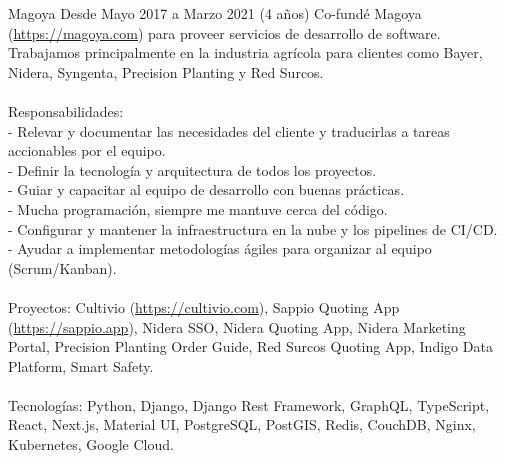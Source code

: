 \begin{enumerate}[leftmargin=0.8cm]
{\begin{itemize}[leftmargin=0.2cm]
      {Magoya}
      {Desde Mayo 2017 a Marzo 2021 (4 años)}
      {
        Co-fundé Magoya (\url{https://magoya.com}) para proveer servicios de desarrollo de software. Trabajamos principalmente en la industria agrícola para clientes como Bayer, Nidera, Syngenta, Precision Planting y Red Surcos.
        \\ \\ Responsabilidades:
        \\ - Relevar y documentar las necesidades del cliente y traducirlas a tareas accionables por el equipo.
        \\ - Definir la tecnología y arquitectura de todos los proyectos.
        \\ - Guiar y capacitar al equipo de desarrollo con buenas prácticas.
        \\ - Mucha programación, siempre me mantuve cerca del código.
        \\ - Configurar y mantener la infraestructura en la nube y los pipelines de CI/CD.
        \\ - Ayudar a implementar metodologías ágiles para organizar al equipo (Scrum/Kanban).
        \\ \\ Proyectos: Cultivio (\url{https://cultivio.com}), Sappio Quoting App (\url{https://sappio.app}), Nidera SSO, Nidera Quoting App, Nidera Marketing Portal, Precision Planting Order Guide, Red Surcos Quoting App, Indigo Data Platform, Smart Safety.
        \\ \\ Tecnologías: Python, Django, Django Rest Framework, GraphQL, TypeScript, React, Next.js, Material UI, PostgreSQL, PostGIS, Redis, CouchDB, Nginx, Kubernetes, Google Cloud.
      }

      ~


\end{itemize}}
\end{enumerate}
